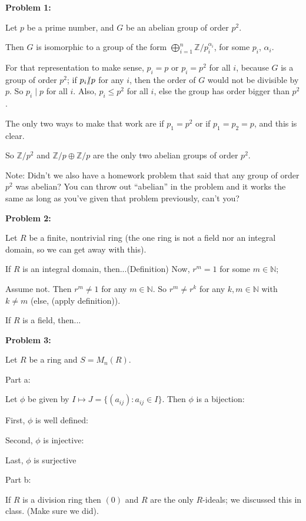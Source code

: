 \documentclass[a4paper,12pt]{article}
\newcommand{\tab}{\hspace{4mm}} %
\newcommand{\shunt}{\vspace{20mm}}
\newcommand{\al}{\alpha} %
\newcommand{\N}{\mathbb{N}}
\newcommand{\Z}{\mathbb{Z}}
\begin{document}
{\bf Problem 1:}

Let $p$ be a prime number, and $G$ be an abelian group of order $p^2$.

Then $G$ is isomorphic to a group of the form $\bigoplus\limits_{i=1}^n \Z/p_i^{\al_i}$, for some $p_i$, $\al_i$.

For that representation to make sense, $p_i=p$ or $p_i=p^2$ for all $i$, because $G$ is a group of order $p^2$; if $p_i \slashed{\mid} p$ for any $i$, then the order of $G$ would not be divisible by $p$. So $p_i \mid p$ for all $i$. Also, $p_i \leq p^2$ for all $i$, else the group has order bigger than $p^2$.

The only two ways to make that work are if $p_1 = p^2$ or if $p_1=p_2=p$, and this is clear.

So $\Z/p^2$ and $\Z/p \oplus \Z/p$ are the only two abelian groups of order $p^2$.

Note: Didn't we also have a homework problem that said that any group of order $p^2$ was abelian? You can throw out ``abelian'' in the problem and it works the same as long as you've given that problem previously, can't you?

\shunt

{\bf Problem 2:}

Let $R$ be a finite, nontrivial ring (the one ring is not a field nor an integral domain, so we can get away with this). 

If $R$ is an integral domain, then...(Definition) Now, $r^m = 1$ for some $m \in \N$;

\tab Assume not. Then $r^m \neq 1$ for any $m \in \N$. So $r^m \neq r^k$ for any $k, m \in \N$ with $k \neq m$ (else, (apply definition)).

If $R$ is a field, then...

\shunt

{\bf Problem 3:}

Let $R$ be a ring and $S=M_n(R)$.

Part a:

Let $\phi$ be given by $I \mapsto J=\{(a_{ij}) : a_{ij} \in I\}$. Then $\phi$ is a bijection:

First, $\phi$ is well defined:

Second, $\phi$ is injective:

Last, $\phi$ is surjective

\shunt

Part b:

If $R$ is a division ring then $(0)$ and $R$ are the only $R$-ideals; we discussed this in class. (Make sure we did).
\end{document}
